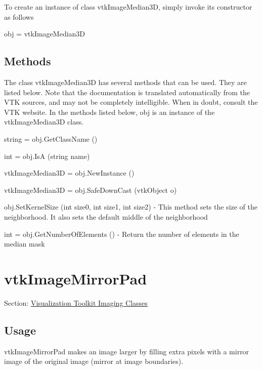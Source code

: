 To create an instance of class vtk\-Image\-Median3\-D, simply invoke its constructor as follows \begin{DoxyVerb}  obj = vtkImageMedian3D
\end{DoxyVerb}
 \hypertarget{vtkwidgets_vtkxyplotwidget_Methods}{}\subsection{Methods}\label{vtkwidgets_vtkxyplotwidget_Methods}
The class vtk\-Image\-Median3\-D has several methods that can be used. They are listed below. Note that the documentation is translated automatically from the V\-T\-K sources, and may not be completely intelligible. When in doubt, consult the V\-T\-K website. In the methods listed below, {\ttfamily obj} is an instance of the vtk\-Image\-Median3\-D class. 
\begin{DoxyItemize}
\item {\ttfamily string = obj.\-Get\-Class\-Name ()}  
\item {\ttfamily int = obj.\-Is\-A (string name)}  
\item {\ttfamily vtk\-Image\-Median3\-D = obj.\-New\-Instance ()}  
\item {\ttfamily vtk\-Image\-Median3\-D = obj.\-Safe\-Down\-Cast (vtk\-Object o)}  
\item {\ttfamily obj.\-Set\-Kernel\-Size (int size0, int size1, int size2)} -\/ This method sets the size of the neighborhood. It also sets the default middle of the neighborhood  
\item {\ttfamily int = obj.\-Get\-Number\-Of\-Elements ()} -\/ Return the number of elements in the median mask  
\end{DoxyItemize}\hypertarget{vtkimaging_vtkimagemirrorpad}{}\section{vtk\-Image\-Mirror\-Pad}\label{vtkimaging_vtkimagemirrorpad}
Section\-: \hyperlink{sec_vtkimaging}{Visualization Toolkit Imaging Classes} \hypertarget{vtkwidgets_vtkxyplotwidget_Usage}{}\subsection{Usage}\label{vtkwidgets_vtkxyplotwidget_Usage}
vtk\-Image\-Mirror\-Pad makes an image larger by filling extra pixels with a mirror image of the original image (mirror at image boundaries).

